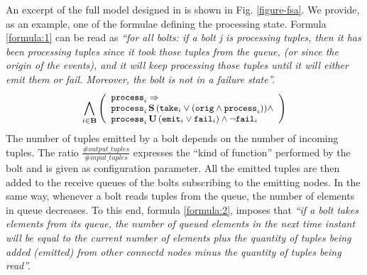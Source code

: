 %	
%	
%	
%	
An excerpt of the full model designed in \cite{MBER16} is shown in Fig. \ref{figure-fsa}.
We provide, as an example, one of the formulae defining the processing state. Formula \ref{formula:1} can be read as \textit{``for all bolts: if a bolt j is processing tuples, then it has been processing tuples since it took those tuples from the queue, (or since the origin of the events), and it will keep processing those tuples until it will either emit them or fail. Moreover, the bolt is not in a failure state''.}
\begin{align}
\small
%
\bigwedge_{
	i \in \mathbf{B} } 
\left( 
\begin{array}{l}
\p{i} \Rightarrow \\
\p{i} \, \Snc \, ( \ta{i} \lor (\ori \land \p{i})) \land \\
\p{i} \, \U \, (\e{i} \lor \f{i}) \land \lnot \f{i} 
\end{array}
\right) \label{formula:1} 
%
\end{align}
The number of tuples emitted by a bolt depends on the number of incoming tuples. The ratio $\frac{\#output\_tuples}{\#input\_tuples}$ %
expresses the ``kind of function''  performed by the bolt and is given as configuration parameter. 
All the emitted tuples are then added to the receive queues of the bolts subscribing to the emitting nodes.
In the same way, whenever a bolt reads tuples from the queue, the number of elements in queue decreases. To this end, formula \ref{formula:2}, imposes that \textit{``if a bolt takes elements from its queue, the number of queued elements in the next time instant will be equal to the current number of elements plus the quantity of tuples being added (emitted) from other connectd nodes minus the quantity of tuples being read''.}
